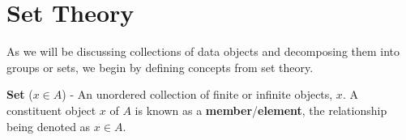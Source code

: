 
\section{Set Theory}

As we will be discussing collections of data objects and decomposing them into groups or sets, we begin by defining concepts from set theory.
%
\begin{defn}
  \textbf{Set} ($x \in A$) - An unordered collection of finite or infinite objects, $x$.
  A constituent object $x$ of $A$ is known as a \textbf{member}/\textbf{element}, the relationship being denoted as $x \in A$.
\end{defn}

